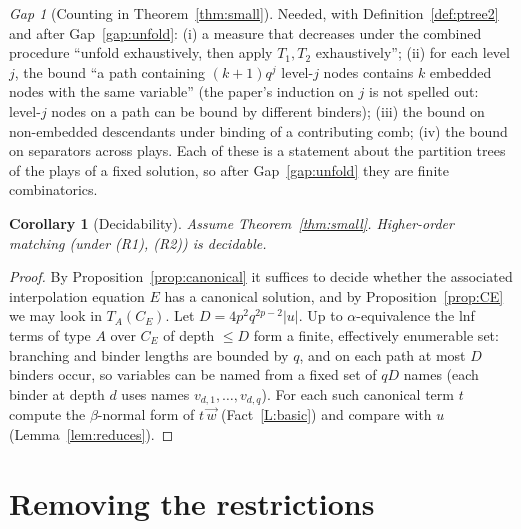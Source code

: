 \documentclass[11pt]{article}
\newcommand{\CE}{C_E}
\theoremstyle{plain}
\newtheorem{corollary}[theorem]{Corollary}
\theoremstyle{definition}
\theoremstyle{remark}
\newtheorem{gap}{Gap}
\begin{document}
\begin{gap}[Counting in Theorem~\ref{thm:small}]\label{gap:count}
Needed, with Definition~\ref{def:ptree2} and after Gap~\ref{gap:unfold}:
(i) a measure that decreases under the combined procedure
``unfold exhaustively, then apply $T_1,T_2$ exhaustively''; (ii) for each
level $j$, the bound ``a path containing $(k+1)q^j$ level-$j$ nodes
contains $k$ embedded nodes with the same variable'' (the paper's
induction on $j$ is not spelled out: level-$j$ nodes on a path can be
bound by different binders); (iii) the bound on non-embedded
descendants under binding of a contributing comb; (iv) the bound on
separators across plays.  Each of these is a statement about the
partition trees of the plays of a fixed solution, so after
Gap~\ref{gap:unfold} they are finite combinatorics.
\end{gap}

\begin{corollary}[Decidability]\label{cor:decidable}
Assume Theorem~\ref{thm:small}.  Higher-order matching (under (R1),
(R2)) is decidable.
\end{corollary}
\begin{proof}
By Proposition~\ref{prop:canonical} it suffices to decide whether the
associated interpolation equation $E$ has a canonical solution, and by
Proposition~\ref{prop:CE} we may look in $T_A(\CE)$.  Let
$D=4p^2q^{2p-2}|u|$.  Up to $\alpha$-equivalence the lnf terms of type $A$
over $\CE$ of depth $\le D$ form a finite, effectively enumerable set:
branching and binder lengths are bounded by $q$, and on each path at most
$D$ binders occur, so variables can be named from a fixed set of
$qD$ names (each binder at depth $d$ uses names
$v_{d,1},\dots,v_{d,q}$).  For each such canonical term $t$ compute the
$\beta$-normal form of $t\,\vec w$ (Fact~\ref{L:basic}) and compare with
$u$ (Lemma~\ref{lem:reduces}).
\end{proof}

\section{Removing the restrictions}\label{sec:restrictions}
\end{document}
